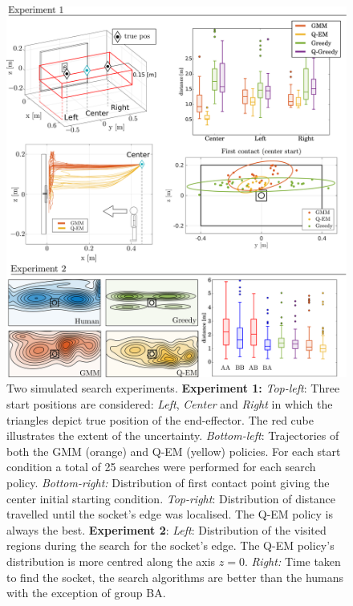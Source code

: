 \documentclass[final,5p,times,twocolumn]{elsarticle}
\begin{document}
\begin{figure}
    \centering
    \includegraphics[width=\linewidth]{./Figure/experiment1.pdf}
    \caption{Two simulated search experiments. \textbf{Experiment 1:} \textit{Top-left}: 
     Three start positions are considered: \textit{Left}, \textit{Center} and \textit{Right} in which the triangles depict true position of the end-effector. 
     The red cube illustrates the extent of the uncertainty. \textit{Bottom-left}: Trajectories of both the GMM (orange) and Q-EM (yellow) policies. 
     For each start condition a total of 25 searches were performed for each search policy.
     \textit{Bottom-right:} Distribution of first contact point giving the center initial starting condition. \textit{Top-right}: Distribution of distance 
     travelled until the socket's edge was localised. The Q-EM policy is always the best.
     \textbf{Experiment 2}: \textit{Left}: Distribution of the visited regions during the search for the socket's edge. The Q-EM policy's distribution 
     is more centred along the axis $z=0$. \textit{Right:} Time taken to find the socket, the search algorithms are better than the humans with the exception 
     of group BA.} 
    \label{fig:experiment12}
\end{figure}
\end{document}
